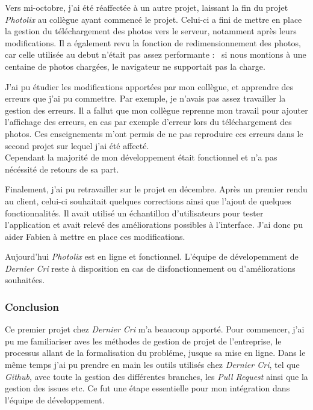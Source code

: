 \documentclass[12pt,a4paper]{article}
\begin{document}
  \bigskip

  Vers mi-octobre, j'ai été réaffectée à un autre projet, laissant la fin
  du projet \emph{Photolix} au collègue ayant commencé le projet. Celui-ci
  a fini de mettre en place la gestion du téléchargement des photos vers
  le serveur, notamment après leurs modifications. Il a également revu la
  fonction de redimensionnement des photos, car celle utilisée au debut
  n'était pas assez performante : ~si nous montions à une centaine de
  photos chargées, le navigateur ne supportait pas la charge.

  \bigskip

  J'ai pu étudier les modifications apportées par mon collègue, et
  apprendre des erreurs que j'ai pu commettre. Par exemple, je n'avais pas
  assez travailler la gestion des erreurs. Il a fallut que mon collègue
  reprenne mon travail pour ajouter l'affichage des erreurs, en cas par
  exemple d'erreur lors du téléchargement des photos. Ces enseignements
  m'ont permis de ne pas reproduire ces erreurs dans le second projet sur
  lequel j'ai été affecté.\\
  Cependant la majorité de mon développement était fonctionnel et n'a pas
  nécéssité de retours de sa part.

  \bigskip

  Finalement, j'ai pu retravailler sur le projet en décembre. Après un
  premier rendu au client, celui-ci souhaitait quelques corrections ainsi
  que l'ajout de quelques fonctionnalités. Il avait utilisé un échantillon
  d'utilisateurs pour tester l'application et avait relevé des
  améliorations possibles à l'interface. J'ai donc pu aider Fabien à
  mettre en place ces modifications.

  \bigskip

  Aujourd'hui \emph{Photolix} est en ligne et fonctionnel. L'équipe de
  dévelopemment de \emph{Dernier Cri} reste à disposition en cas de
  disfonctionnement ou d'améliorations souhaitées.

  \subsubsection{Conclusion}\label{conclusion}

  \bigskip

  Ce premier projet chez \emph{Dernier Cri} m'a beaucoup apporté. Pour
  commencer, j'ai pu me familiariser aves les méthodes de gestion de
  projet de l'entreprise, le processus allant de la formalisation du
  probléme, jusque sa mise en ligne. Dans le même temps j'ai pu prendre en
  main les outils utilisés chez \emph{Dernier Cri}, tel que \emph{Github},
  avec toute la gestion des différentes branches, les \emph{Pull Request}
  ainsi que la gestion des issues etc. Ce fut une étape essentielle pour
  mon intégration dans l'équipe de développement.
\end{document}
